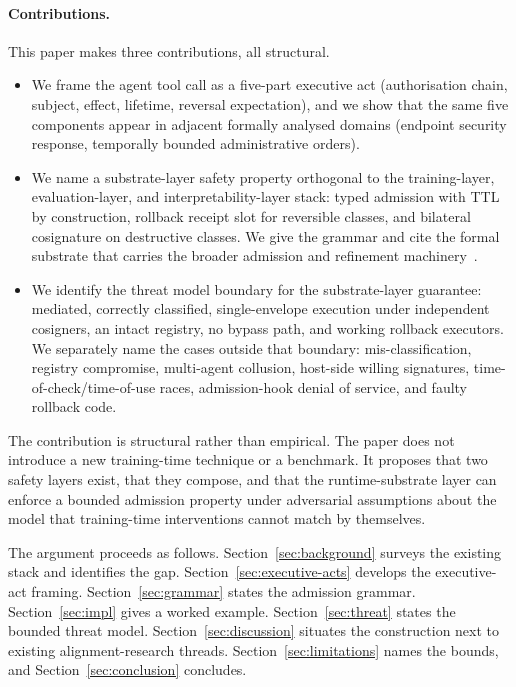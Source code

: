\paragraph{Contributions.}
This paper makes three contributions, all structural.
\begin{itemize}
\item We frame the agent tool call as a five-part executive act (authorisation chain, subject, effect, lifetime, reversal expectation), and we show that the same five components appear in adjacent formally analysed domains (endpoint security response, temporally bounded administrative orders).
\item We name a substrate-layer safety property orthogonal to the training-layer, evaluation-layer, and interpretability-layer stack: typed admission with TTL by construction, rollback receipt slot for reversible classes, and bilateral cosignature on destructive classes. We give the grammar and cite the formal substrate that carries the broader admission and refinement machinery~\cite{programmableSovereignty2026}.
\item We identify the threat model boundary for the substrate-layer guarantee: mediated, correctly classified, single-envelope execution under independent cosigners, an intact registry, no bypass path, and working rollback executors. We separately name the cases outside that boundary: mis-classification, registry compromise, multi-agent collusion, host-side willing signatures, time-of-check/time-of-use races, admission-hook denial of service, and faulty rollback code.
\end{itemize}

The contribution is structural rather than empirical. The paper does not introduce a new training-time technique or a benchmark. It proposes that two safety layers exist, that they compose, and that the runtime-substrate layer can enforce a bounded admission property under adversarial assumptions about the model that training-time interventions cannot match by themselves.

The argument proceeds as follows. Section~\ref{sec:background} surveys the existing stack and identifies the gap. Section~\ref{sec:executive-acts} develops the executive-act framing. Section~\ref{sec:grammar} states the admission grammar. Section~\ref{sec:impl} gives a worked example. Section~\ref{sec:threat} states the bounded threat model. Section~\ref{sec:discussion} situates the construction next to existing alignment-research threads. Section~\ref{sec:limitations} names the bounds, and Section~\ref{sec:conclusion} concludes.
